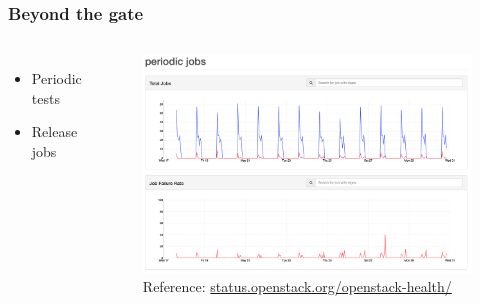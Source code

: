 \documentclass[aspectratio=169,11pt,hyperref={colorlinks=true}]{beamer}
\begin{document}
\begin{frame}
    \frametitle{Beyond the gate}
    \begin{columns}
            \begin{itemize}
                \item{Periodic tests}
                \item{Release jobs}
            \end{itemize}
            \begin{figure}
                \includegraphics[width=1\textwidth]{periodic_jobs.png}
                \caption{Reference: \href{http://status.openstack.org/openstack-health/\#/g/build_queue/periodic}{status.openstack.org/openstack-health/}}
            \end{figure}
    \end{columns}
\end{frame}

\end{document}
